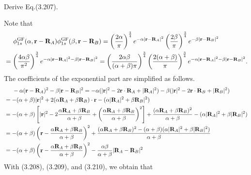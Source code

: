 \documentclass[a4paper]{book}
\newcounter{exercise}[chapter]
\newcounter{solution}[chapter]
\newcommand{\bfr}{{\bf r}}
\newcommand{\bfR}{{\bf R}}
\begin{document}
	\begin{exercise}
	Derive Eq.(3.207).
	\end{exercise}
	
	\begin{solution}
	
	Note that
	\begin{align*}
		&\hspace{1.4em}\phi^{\rm GF}_{1s} ( \alpha , \bfr - \bfR_A ) \phi^{\rm GF}_{1s} ( \beta , \bfr - \bfR_B ) = \left( \frac{2\alpha}{\pi} \right)^{ \frac{3}{4} } e^{-\alpha | \bfr - \bfR_A |^2 } \left( \frac{2\beta}{\pi} \right)^{ \frac{3}{4} } e^{-\beta | \bfr - \bfR_B |^2 } \\
		&= \left( \frac{4\alpha\beta}{\pi^2} \right)^{ \frac{3}{4} } e^{-\alpha | \bfr - \bfR_A |^2 - \beta | \bfr - \bfR_B |^2 } = \left( \frac{ 2 \alpha \beta }{ ( \alpha + \beta )\pi} \right)^{ \frac{3}{4} } \left( \frac{ 2 ( \alpha + \beta ) }{\pi} \right)^{ \frac{3}{4} } e^{-\alpha | \bfr - \bfR_A |^2 - \beta | \bfr - \bfR_B |^2 } .
	\end{align*}
	The coefficients of the exponential part are simplified as follows.
	\begin{align*}
		&\hspace{1.4em}- \alpha ( \bfr - \bfR_A )^2 - \beta | \bfr - \bfR_B |^2 = - \alpha ( | \bfr |^2 - 2 \bfr \cdot \bfR_A + | \bfR_A |^2 ) - \beta ( | \bfr |^2 - 2 \bfr \cdot \bfR_B + | \bfR_B |^2 ) \\
		&= - ( \alpha + \beta ) | \bfr |^2 + 2 ( \alpha \bfR_A + \beta \bfR_B ) \cdot \bfr - ( \alpha | \bfR_A |^2 + \beta \bfR_B |^2 ) \\
		&= - ( \alpha + \beta ) \left[ | \bfr |^2 - 2\frac{ \alpha \bfR_A + \beta \bfR_B }{ \alpha + \beta } + \left( \frac{ \alpha \bfR_A + \beta \bfR_B }{ \alpha + \beta } \right)^2 \right] + \frac{ ( \alpha \bfR_A + \beta \bfR_B )^2 }{ \alpha + \beta } - ( \alpha | \bfR_A |^2 + \beta | \bfR_B |^2 ) \\
		&= - ( \alpha + \beta ) \left( \bfr - \frac{ \alpha \bfR_A + \beta \bfR_B }{ \alpha + \beta } \right)^2 + \frac{ ( \alpha \bfR_A + \beta \bfR_B )^2 - ( \alpha + \beta ) ( \alpha | \bfR_A |^2 + \beta | \bfR_B |^2 ) }{ \alpha + \beta } \\
		&= - ( \alpha + \beta ) \left( \bfr - \frac{ \alpha \bfR_A + \beta \bfR_B }{ \alpha + \beta } \right)^2 - \frac{ \alpha \beta }{ \alpha + \beta } | \bfR_A - \bfR_B |^2
	\end{align*}
	With (3.208), (3.209), and (3.210), we obtain that
	\begin{align*}

\end{align*}
\end{solution}
\end{document}
